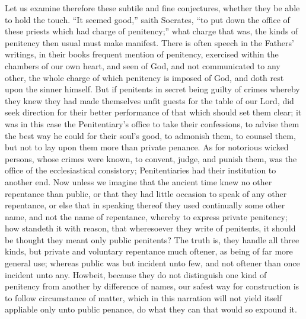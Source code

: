 Let us examine therefore these subtile and fine conjectures, whether they be able to hold the touch. “It seemed good,” saith Socrates, “to put down the office of these priests which had charge of penitency;” what charge that was, the  kinds of penitency then usual must make manifest. There is often speech in the Fathers’ writings, in their books frequent mention of penitency, exercised within the chambers of our own heart, and seen of God, and not communicated to any other, the whole charge of which penitency is imposed of God, and doth rest upon the sinner himself. But if penitents in secret being guilty of crimes whereby they knew they had made themselves unfit guests for the table of our Lord, did seek direction for their better performance of that which should set them clear; it was in this case the Penitentiary’s office to take their confessions, to advise them the best way he could for their soul’s good, to admonish them, to counsel them, but not to lay upon them more than private penance. As for notorious wicked persons, whose crimes were known, to convent, judge, and punish them, was the office of the ecclesiastical consistory; Penitentiaries had their institution to another end. Now unless we imagine that the ancient time knew no other repentance than public, or that they had little occasion to speak of any other repentance, or else that in speaking thereof they used continually some other name, and not the name of repentance, whereby to express private penitency; how standeth it with reason, that wheresoever they write of penitents, it should be thought they meant only public penitents? The truth is, they handle all three kinds, but private and voluntary repentance much oftener, as being of far more general use; whereas public was but incident unto few, and not oftener than once incident unto any. Howbeit, because they do not distinguish one kind of penitency from another by difference of names, our safest way for construction is to follow circumstance of matter, which in this narration will not yield itself appliable only unto public penance, do what they can that would so expound it.

